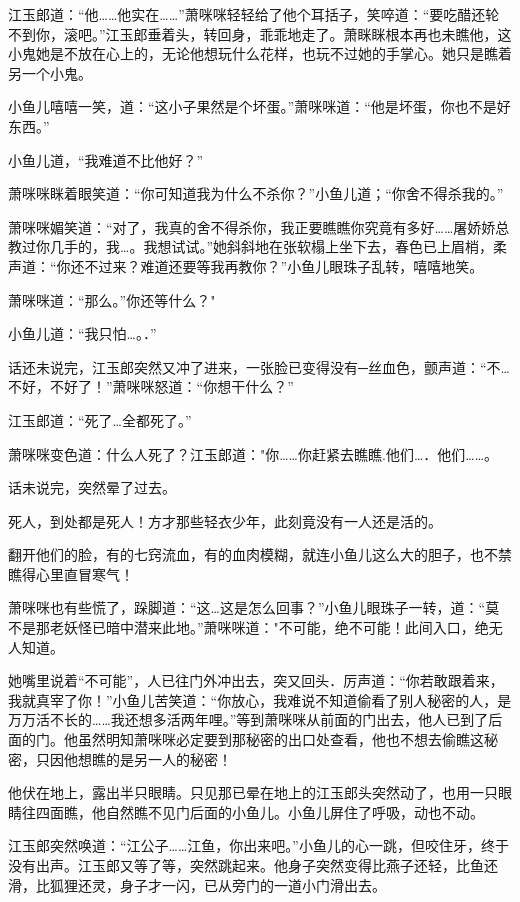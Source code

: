 \documentclass[12pt,oneside]{book}
\begin{document}
江玉郎道：``他\ldots\ldots 他实在\ldots\ldots{}''萧咪咪轻轻给了他个耳括子，笑啐道：``要吃醋还轮不到你，滚吧。''江玉郎垂着头，转回身，乖乖地走了。萧眯眯根本再也未瞧他，这小鬼她是不放在心上的，无论他想玩什么花样，也玩不过她的手掌心。她只是瞧着另一个小鬼。

小鱼儿嘻嘻一笑，道：``这小子果然是个坏蛋。''萧咪咪道：``他是坏蛋，你也不是好东西。''

小鱼儿道，``我难道不比他好？''

萧咪咪眯着眼笑道：``你可知道我为什么不杀你？''小鱼儿道；``你舍不得杀我的。''

萧咪咪媚笑道：``对了，我真的舍不得杀你，我正要瞧瞧你究竟有多好\ldots\ldots 屠娇娇总教过你几手的，我\ldots。我想试试。''她斜斜地在张软榻上坐下去，春色已上眉梢，柔声道：``你还不过来？难道还要等我再教你？''小鱼儿眼珠子乱转，嘻嘻地笑。

萧咪咪道：``那么。''你还等什么？"

小鱼儿道：``我只怕\ldots。．''

话还未说完，江玉郎突然又冲了进来，一张脸已变得没有─丝血色，颤声道：``不\ldots 不好，不好了！''萧咪咪怒道：``你想干什么？''

江玉郎道：``死了\ldots 全都死了。''

萧咪咪变色道：什么人死了？江玉郎道："你\ldots\ldots 你赶紧去瞧瞧.他们\ldots．他们\ldots\ldots。

话未说完，突然晕了过去。

死人，到处都是死人！方才那些轻衣少年，此刻竟没有一人还是活的。

翻开他们的脸，有的七窍流血，有的血肉模糊，就连小鱼儿这么大的胆子，也不禁瞧得心里直冒寒气！

萧咪咪也有些慌了，跺脚道：``这\ldots 这是怎么回事？''小鱼儿眼珠子一转，道：``莫不是那老妖怪已暗中潜来此地。''萧咪咪道："不可能，绝不可能！此间入口，绝无人知道。

她嘴里说着``不可能''，人已往门外冲出去，突又回头．厉声道：``你若敢跟着来，我就真宰了你！''小鱼儿苦笑道：``你放心，我难说不知道偷看了别人秘密的人，是万万活不长的\ldots\ldots 我还想多活两年哩。''等到萧咪咪从前面的门出去，他人已到了后面的门。他虽然明知萧咪咪必定要到那秘密的出口处查看，他也不想去偷瞧这秘密，只因他想瞧的是另一人的秘密！

他伏在地上，露出半只眼睛。只见那已晕在地上的江玉郎头突然动了，也用一只眼睛往四面瞧，他自然瞧不见门后面的小鱼儿。小鱼儿屏住了呼吸，动也不动。

江玉郎突然唤道：``江公子\ldots\ldots 江鱼，你出来吧。''小鱼儿的心一跳，但咬住牙，终于没有出声。江玉郎又等了等，突然跳起来。他身子突然变得比燕子还轻，比鱼还滑，比狐狸还灵，身子才一闪，已从旁门的一道小门滑出去。
\end{document}

